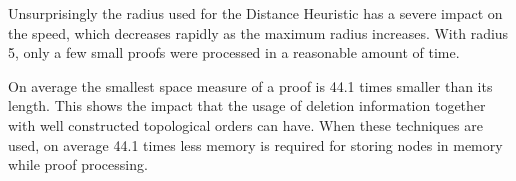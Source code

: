 Unsurprisingly the radius used for the Distance Heuristic has a severe impact on the speed, which decreases rapidly as the maximum radius increases. 
With radius 5, only a few small proofs were processed in a reasonable amount of time.

On average the smallest space measure of a proof is 44.1 times smaller than its length. 
This shows the impact that the usage of deletion information together with well constructed topological orders can have. 
When these techniques are used, on average 44.1 times less memory is required for storing nodes in memory while proof processing.
